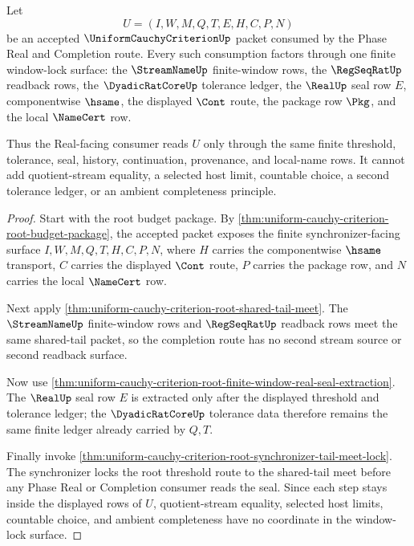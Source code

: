 \begin{theorem}
\label{thm:uniform-cauchy-criterion-streamname-regseqrat-real-window-lock}
Let
$$
U=(I,W,M,Q,T,E,H,C,P,N)
$$
be an accepted $\UniformCauchyCriterionUp$ packet consumed by the Phase Real and Completion route. Every such consumption factors through one finite window-lock surface: the $\StreamNameUp$ finite-window rows, the $\RegSeqRatUp$ readback rows, the $\DyadicRatCoreUp$ tolerance ledger, the $\RealUp$ seal row $E$, componentwise $\hsame$, the displayed $\Cont$ route, the package row $\Pkg$, and the local $\NameCert$ row.

Thus the Real-facing consumer reads $U$ only through the same finite threshold, tolerance, seal, history, continuation, provenance, and local-name rows. It cannot add quotient-stream equality, a selected host limit, countable choice, a second tolerance ledger, or an ambient completeness principle.
\end{theorem}
\begin{proof}
Start with the root budget package. By \autoref{thm:uniform-cauchy-criterion-root-budget-package}, the accepted packet exposes the finite synchronizer-facing surface $I,W,M,Q,T,H,C,P,N$, where $H$ carries the componentwise $\hsame$ transport, $C$ carries the displayed $\Cont$ route, $P$ carries the package row, and $N$ carries the local $\NameCert$ row.

Next apply \autoref{thm:uniform-cauchy-criterion-root-shared-tail-meet}. The $\StreamNameUp$ finite-window rows and $\RegSeqRatUp$ readback rows meet the same shared-tail packet, so the completion route has no second stream source or second readback surface.

Now use \autoref{thm:uniform-cauchy-criterion-root-finite-window-real-seal-extraction}. The $\RealUp$ seal row $E$ is extracted only after the displayed threshold and tolerance ledger; the $\DyadicRatCoreUp$ tolerance data therefore remains the same finite ledger already carried by $Q,T$.

Finally invoke \autoref{thm:uniform-cauchy-criterion-root-synchronizer-tail-meet-lock}. The synchronizer locks the root threshold route to the shared-tail meet before any Phase Real or Completion consumer reads the seal. Since each step stays inside the displayed rows of $U$, quotient-stream equality, selected host limits, countable choice, and ambient completeness have no coordinate in the window-lock surface.
\end{proof}

